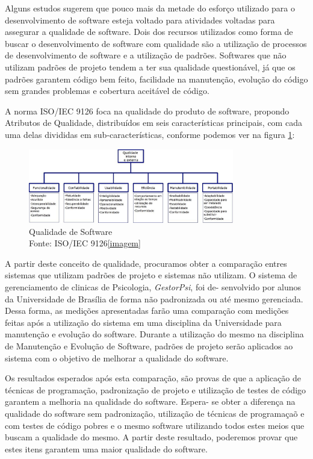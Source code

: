 
Alguns estudos sugerem que pouco mais da metade do esforço utilizado para o desenvolvimento de software
esteja voltado para atividades voltadas para assegurar a qualidade de software. Dois dos recursos utilizados como
forma de buscar o desenvolvimento de software com qualidade são a utilização de processos de desenvolvimento
de software e a utilização de padrões. Softwares que não utilizam padrões de projeto tendem a ter sua qualidade
questionável, já que os padrões garantem código bem feito, facilidade na manutenção, evolução do código sem
grandes problemas e cobertura aceitável de código.

A norma ISO/IEC 9126 foca na qualidade do produto de software, propondo Atributos de Qualidade,
distribuídos em seis características principais, com cada uma delas divididas em sub-características, conforme
podemos ver na figura \ref{iso}:
\begin{figure}[h]
	\centering
	\includegraphics[width=0.8\textwidth]{conteudo/qualidade}
	\caption{Qualidade de Software\\Fonte: ISO/IEC 9126\cref{imagem}}
	\label{iso}
\end{figure}

A partir deste conceito de qualidade, procuramos obter a comparação entres sistemas que utilizam padrões
de projeto e sistemas não utilizam. O sistema de gerenciamento de clinicas de Psicologia, \textit{GestorPsi}, foi de-
senvolvido por alunos da Universidade de Brasília de forma não padronizada ou até mesmo gerenciada. Dessa
forma, as medições apresentadas farão uma comparação com medições feitas após a utilização do sistema em
uma disciplina da Universidade para manutenção e evolução do software. Durante a utilização do mesmo na
disciplina de Manutenção e Evolução de Software, padrões de projeto serão aplicados ao sistema com o objetivo
de melhorar a qualidade do software.

Os resultados esperados após esta comparação, são provas de que a aplicação de técnicas de programação,
padronização de projeto e utilização de testes de código garantem a melhoria na qualidade do software. Espera-
se obter a diferença na qualidade do software sem padronização, utilização de técnicas de programaçaõ e com
testes de código pobres e o mesmo software utilizando todos estes meios que buscam a qualidade do mesmo. A
partir deste resultado, poderemos provar que estes itens garantem uma maior qualidade do software.

